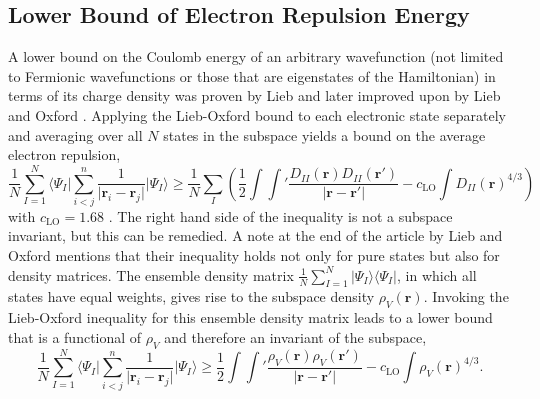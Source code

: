 \documentclass[journal=jacsat,manuscript=article]{achemso}
\renewcommand\vec[1]{\mathbf{#1}}
\begin{document}
\subsection{Lower Bound of Electron Repulsion Energy}
A lower bound on the Coulomb energy of an arbitrary wavefunction
(not limited to Fermionic wavefunctions or those that are eigenstates of the Hamiltonian) in terms of
its charge density was proven by Lieb \cite{Lieb1979} and later improved upon by Lieb and Oxford \cite{Lieb1981}.
Applying the Lieb-Oxford bound to each electronic state separately and averaging over all $N$ states in the subspace
yields a bound on the average electron repulsion,
\begin{equation}
\frac{1}{N} \sum_{I=1}^{N} \langle \Psi_{I} \vert \sum_{i < j}^{n} \frac{1}{\vert \vec{r}_i - \vec{r}_j \vert} \vert \Psi_{I} \rangle
\geq \frac{1}{N} \sum_{I} \left( \frac{1}{2} \int \int' \frac{D_{II}(\vec{r}) D_{II}(\vec{r}')}{\vert \vec{r} - \vec{r}' \vert}
 - c_{\text{LO}} \int D_{II}(\vec{r})^{4/3} \right) \label{eqn:lieb_oxford_bound_sum_over_states} 
\end{equation}
with $c_{\text{LO}} = 1.68$ \cite{Lieb1981}. The right hand side of the inequality is not a subspace invariant, but this can be
remedied. A note at the end of the article by Lieb and Oxford \cite{Lieb1981} mentions that their inequality holds not only for pure states
but also for density matrices. The ensemble density matrix $\frac{1}{N} \sum_{I=1}^{N} \vert \Psi_I \rangle \langle \Psi_I \vert$, in which all
states have equal weights, gives rise to the subspace density $\rho_V(\vec{r})$. Invoking the Lieb-Oxford inequality for this ensemble
density matrix leads to a lower bound that is a functional of $\rho_V$ and therefore an invariant of the subspace,
\begin{equation}
  \frac{1}{N} \sum_{I=1}^{N} \langle \Psi_{I} \vert \sum_{i < j}^{n} \frac{1}{\vert \vec{r}_i - \vec{r}_j \vert} \vert \Psi_{I} \rangle
  \geq \frac{1}{2} \int \int' \frac{\rho_V(\vec{r}) \rho_V(\vec{r}')}{\vert \vec{r} - \vec{r}' \vert}
   - c_{\text{LO}} \int \rho_V(\vec{r})^{4/3}. \label{eqn:lieb_oxford_bound_subspace_invariant} 
\end{equation}
\end{document}

